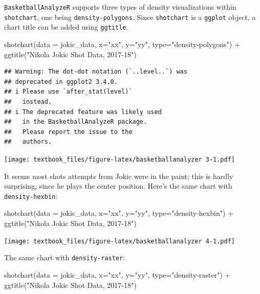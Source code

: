 \documentclass[
  11pt,
]{book}
\newenvironment{Shaded}{\begin{snugshade}}{\end{snugshade}}
\newcommand{\AttributeTok}[1]{\textcolor[rgb]{0.77,0.63,0.00}{#1}}
\newcommand{\FunctionTok}[1]{\textcolor[rgb]{0.00,0.00,0.00}{#1}}
\newcommand{\NormalTok}[1]{#1}
\newcommand{\SpecialCharTok}[1]{\textcolor[rgb]{0.00,0.00,0.00}{#1}}
\newcommand{\StringTok}[1]{\textcolor[rgb]{0.31,0.60,0.02}{#1}}
\theoremstyle{definition}
\theoremstyle{definition}
\theoremstyle{definition}
\theoremstyle{definition}
\theoremstyle{remark}
\begin{document}
\texttt{BasketballAnalyzeR} supports three types of density visualizations within \texttt{shotchart}, one being \texttt{density-polygons}. Since \texttt{shotchart} is a \texttt{ggplot} object, a chart title can be added using \texttt{ggtitle}.

\begin{Shaded}
\begin{Highlighting}[]
\FunctionTok{shotchart}\NormalTok{(}\AttributeTok{data =}\NormalTok{ jokic\_data, }\AttributeTok{x=}\StringTok{"xx"}\NormalTok{, }\AttributeTok{y=}\StringTok{"yy"}\NormalTok{, }\AttributeTok{type=}\StringTok{"density{-}polygons"}\NormalTok{) }\SpecialCharTok{+} 
  \FunctionTok{ggtitle}\NormalTok{(}\StringTok{"Nikola Jokic Shot Data, 2017{-}18"}\NormalTok{)}
\end{Highlighting}
\end{Shaded}

\begin{verbatim}
## Warning: The dot-dot notation (`..level..`) was
## deprecated in ggplot2 3.4.0.
## i Please use `after_stat(level)`
##   instead.
## i The deprecated feature was likely used
##   in the BasketballAnalyzeR package.
##   Please report the issue to the
##   authors.
\end{verbatim}

\texttt{[image: textbook\_files/figure-latex/basketballanalyzer 3-1.pdf]}

It seems most shots attempts from Jokic were in the paint; this is hardly surprising, since he plays the center position. Here's the same chart with \texttt{density-hexbin}:

\begin{Shaded}
\begin{Highlighting}[]
\FunctionTok{shotchart}\NormalTok{(}\AttributeTok{data =}\NormalTok{ jokic\_data, }\AttributeTok{x=}\StringTok{"xx"}\NormalTok{, }\AttributeTok{y=}\StringTok{"yy"}\NormalTok{, }\AttributeTok{type=}\StringTok{"density{-}hexbin"}\NormalTok{) }\SpecialCharTok{+} 
  \FunctionTok{ggtitle}\NormalTok{(}\StringTok{"Nikola Jokic Shot Data, 2017{-}18"}\NormalTok{)}
\end{Highlighting}
\end{Shaded}

\texttt{[image: textbook\_files/figure-latex/basketballanalyzer 4-1.pdf]}

The same chart with \texttt{density-raster}:

\begin{Shaded}
\begin{Highlighting}[]
\FunctionTok{shotchart}\NormalTok{(}\AttributeTok{data =}\NormalTok{ jokic\_data, }\AttributeTok{x=}\StringTok{"xx"}\NormalTok{, }\AttributeTok{y=}\StringTok{"yy"}\NormalTok{, }\AttributeTok{type=}\StringTok{"density{-}raster"}\NormalTok{) }\SpecialCharTok{+} 
  \FunctionTok{ggtitle}\NormalTok{(}\StringTok{"Nikola Jokic Shot Data, 2017{-}18"}\NormalTok{)}
\end{Highlighting}
\end{Shaded}
\end{document}
